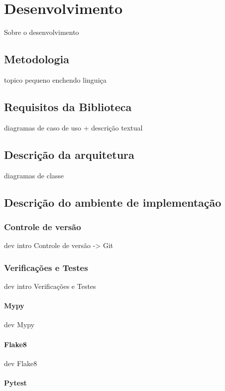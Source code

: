 \chapter{Desenvolvimento}
Sobre o desenvolvimento

\section{Metodologia}
topico pequeno enchendo linguiça

\section{Requisitos da Biblioteca}

diagramas de caso de uso + descrição textual

\section{Descrição da arquitetura}

diagramas de classe

\section{Descrição do ambiente de implementação}


\subsection{Controle de versão}

dev intro Controle de versão -> Git

\subsection{Verificações e Testes}

dev intro Verificações e Testes

\subsubsection{Mypy}

dev Mypy

\subsubsection{Flake8}

dev Flake8

\subsubsection{Pytest}


